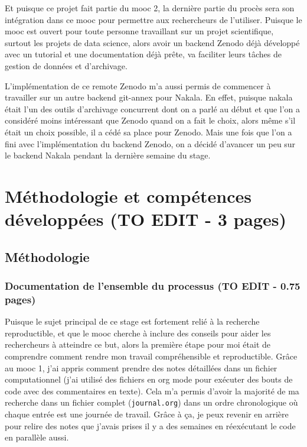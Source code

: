 \documentclass[11pt]{article}
\begin{document}
Et puisque ce projet fait partie du mooc 2, la dernière partie du
procès sera son intégration dans ce mooc pour permettre aux
rechercheurs de l'utiliser. Puisque le mooc est ouvert pour toute
personne travaillant sur un projet scientifique, surtout les projets
de data science, alors avoir un backend Zenodo déjà développé avec un
tutorial et une documentation déjà prête, va faciliter leurs tâches de
gestion de données et d'archivage.

L'implémentation de ce remote Zenodo m'a aussi permis de commencer à
travailler sur un autre backend git-annex pour Nakala. En effet,
puisque nakala était l'un des outils d'archivage concurrent dont on a
parlé au début et que l'on a considéré moins intéressant que Zenodo
quand on a fait le choix, alors même s'il était un choix possible, il
a cédé sa place pour Zenodo. Mais une fois que l'on a fini avec
l'implémentation du backend Zenodo, on a décidé d'avancer un peu sur
le backend Nakala pendant la dernière semaine du stage. 

\section{Méthodologie et compétences développées (TO EDIT - 3 pages)}
\label{sec:org4b7419d}
\subsection{Méthodologie}
\label{sec:org34e5a53}
\subsubsection{Documentation de l'ensemble du processus (TO EDIT - 0.75 pages)}
\label{sec:org0544898}
Puisque le sujet principal de ce stage est fortement relié à la
recherche reproductible, et que le mooc cherche à inclure des conseils
pour aider les rechercheurs à atteindre ce but, alors la première
étape pour moi était de comprendre comment rendre mon travail
compréhensible et reproductible. Grâce au mooc 1, j'ai appris comment
prendre des notes détaillées dans un fichier computationnel (j'ai
utilisé des fichiers en org mode pour exécuter des bouts de code avec
des commentaires en texte). Cela m'a permis d'avoir la majorité de ma
recherche dans un fichier complet (\texttt{journal.org}) dans un ordre
chronologique où chaque entrée est une journée de travail. Grâce à ça,
je peux revenir en arrière pour relire des notes que j'avais prises
il y a des semaines en réexécutant le code en parallèle aussi.
\end{document}
